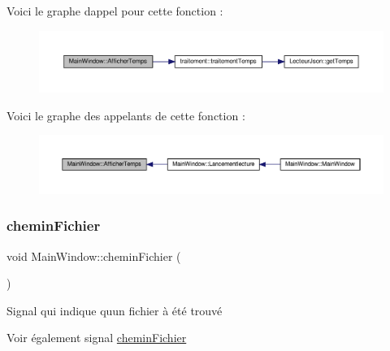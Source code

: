 Voici le graphe d\textquotesingle{}appel pour cette fonction \+:
\nopagebreak
\begin{figure}[H]
\begin{center}
\leavevmode
\includegraphics[width=350pt]{class_main_window_a33811a52abf8f1ce71ec4e150d9c9ac8_cgraph}
\end{center}
\end{figure}
Voici le graphe des appelants de cette fonction \+:
\nopagebreak
\begin{figure}[H]
\begin{center}
\leavevmode
\includegraphics[width=350pt]{class_main_window_a33811a52abf8f1ce71ec4e150d9c9ac8_icgraph}
\end{center}
\end{figure}
\mbox{\label{class_main_window_a397116dafcb548fec351091cc025b822}} 
\subsubsection{\texorpdfstring{chemin\+Fichier}{cheminFichier}}
{\footnotesize\ttfamily void Main\+Window\+::chemin\+Fichier (\begin{DoxyParamCaption}\item[{Q\+String}]{ }\end{DoxyParamCaption})\hspace{0.3cm}{\ttfamily [signal]}}



Signal qui indique qu\textquotesingle{}un fichier à été trouvé 

\begin{DoxySeeAlso}{Voir également}
signal \hyperlink{class_main_window_a397116dafcb548fec351091cc025b822}{chemin\+Fichier} 
\end{DoxySeeAlso}


